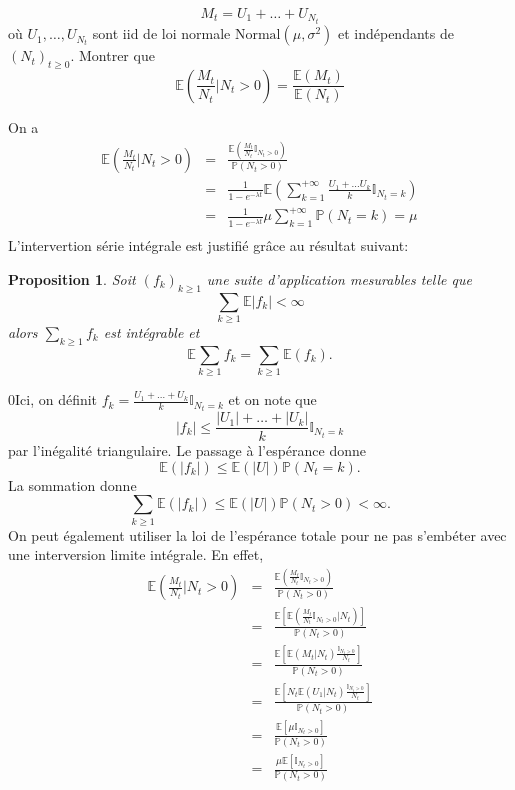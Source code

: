 \documentclass[11pts, answers]{exam}
\newcommand*{\Prob}{\mathbb{P}}
\newcommand*{\E}{\mathbb{E}}
\newtheorem{prop}{Proposition}
\newcommand*{\ind}{\mathbb{I}}
\begin{document}
\begin{questions}
\begin{parts}
$$
M_t = U_1+\ldots+  U_{N_t}
$$
où $U_1,\ldots, U_{N_t}$ sont iid de loi normale $\text{Normal}(\mu ,\sigma^2 )$ et indépendants de $(N_t)_{t\geq 0}$. Montrer que 
$$
\mathbb{E}\left(\frac{M_t}{N_t}\Big\rvert N_t>0\right) = \frac{\mathbb{E}(M_t)}{\mathbb{E}(N_t)}
$$
\begin{solution}
On a 
\begin{eqnarray*}
\mathbb{E}\left(\frac{M_t}{N_t}\Big\rvert N_t>0\right)&=& \frac{\mathbb{E}\left(\frac{M_t}{N_t}\mathbb{I}_{N_t>0}\right)}{\mathbb{P}(N_t>0)}\\
&=&\frac{1}{1-e^{-\lambda t}}\mathbb{E}\left(\sum_{k = 1}^{+\infty}\frac{U_1+\ldots U_k}{k}\mathbb{I}_{N_t=k}\right)\\
&=&\frac{1}{1-e^{-\lambda t}}\mu\sum_{k = 1}^{+\infty}\mathbb{P}(N_t=k)=\mu\\
\end{eqnarray*}
L'intervertion série intégrale est justifié grâce au résultat suivant:
\begin{prop}
Soit $(f_k)_{k\geq 1}$ une suite d'application mesurables telle que 
$$
\sum_{k\geq 1}\E|f_k|<\infty
$$
alors $\sum_{k\geq 1}f_k$ est intégrable et 
$$
\E\sum_{k\geq 1}f_k=\sum_{k\geq1}\E(f_k).
$$
\end{prop}
0Ici, on définit $f_k = \frac{U_1+\ldots+ U_k}{k}\ind_{N_t = k}$ et on note que 
$$
|f_k|\leq\frac{|U_1|+\ldots+ |U_k|}{k}\ind_{N_t = k}
$$
par l'inégalité triangulaire. Le passage à l'espérance donne 
$$
\E(|f_k|)\leq\E(|U|)\Prob(N_t = k).
$$
La sommation donne 
$$
\sum_{k\geq 1}\E(|f_k|)\leq\E(|U|)\Prob(N_t > 0)<\infty.
$$
On peut également utiliser la loi de l'espérance totale pour ne pas s'embéter avec une interversion limite intégrale. En effet, 
\begin{eqnarray*}
\mathbb{E}\left(\frac{M_t}{N_t}\Big\rvert N_t>0\right)&=& \frac{\mathbb{E}\left(\frac{M_t}{N_t}\mathbb{I}_{N_t>0}\right)}{\mathbb{P}(N_t>0)}\\
&=&\frac{\mathbb{E}\left[\mathbb{E}\left(\frac{M_t}{N_t}\mathbb{I}_{N_t>0}|N_t\right)\right]}{\mathbb{P}(N_t>0)}\\
&=&\frac{\mathbb{E}\left[\mathbb{E}\left(M_t|N_t\right)\frac{\mathbb{I}_{N_t>0}}{N_t}\right]}{\mathbb{P}(N_t>0)}\\
&=&\frac{\mathbb{E}\left[N_t\mathbb{E}\left(U_1|N_t\right)\frac{\mathbb{I}_{N_t>0}}{N_t}\right]}{\mathbb{P}(N_t>0)}\\
&=&\frac{\mathbb{E}\left[\mu\mathbb{I}_{N_t>0}\right]}{\mathbb{P}(N_t>0)}\\
&=&\frac{\mu\mathbb{E}\left[\mathbb{I}_{N_t>0}\right]}{\mathbb{P}(N_t>0)}\\

\end{eqnarray*}
\end{solution}
\end{parts}
\end{questions}
\end{document}

